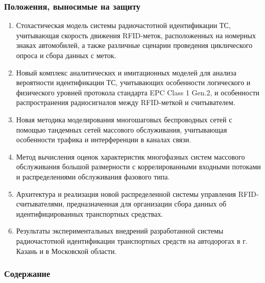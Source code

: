 \begin{frame}
    \setcounter{framenumber}{1}
    \maketitle
\end{frame}

\begin{frame}[allowframebreaks]
    \frametitle{Положения, выносимые на защиту}
    \begin{enumerate}
        \item Стохастическая модель системы радиочастотной идентификации ТС, учитывающая скорость движения RFID-меток, расположенных на номерных знаках автомобилей, а также различные сценарии проведения циклического опроса и сбора данных с меток.
        \item Новый комплекс аналитических и имитационных моделей для анализа вероятности идентификации ТС, учитывающих особенности логического и физического уровней протокола стандарта EPC Class 1 Gen.2, и особенности распространения радиосигналов между RFID-меткой и считывателем.
        \item Новая методика моделирования многошаговых беспроводных сетей с помощью тандемных сетей массового обслуживания, учитывающая особенности трафика и интерференции в каналах связи.
        \framebreak
        \item Метод вычисления оценок характеристик многофазных систем массового обслуживания большой размерности с коррелированными входными потоками и распределениями обслуживания фазового типа.
        \item Архитектура и реализация новой распределенной системы управления RFID-считывателями, предназначенная для организации сбора данных об идентифицированных транспортных средствах.
        \item Результаты экспериментальных внедрений разработанной системы радиочастотной идентификации транспортных средств на автодорогах в г. Казань и в Московской области.
    \end{enumerate}
\end{frame}

\begin{frame}
    \frametitle{Содержание}
    \tableofcontents
\end{frame}
